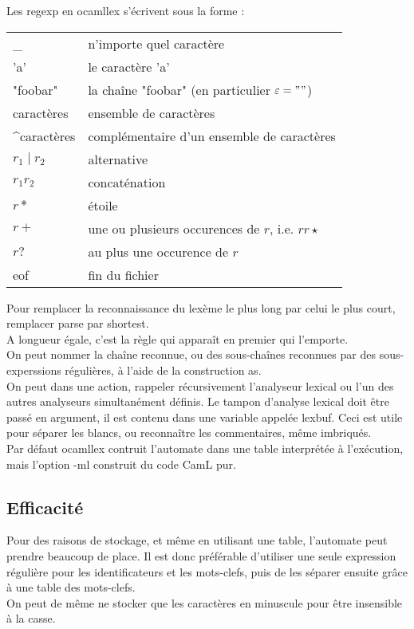 \documentclass{cours}
\begin{document}
Les regexp en \textmd{ocamllex} s'écrivent sous la forme : 
\begin{center}
    \begin{tabular}{>{\textmd{}}ll}
        \toprule
        \_  & n'importe quel caractère\\
        'a' & le caractère \textmd{'a'}\\
        "foobar" & la chaîne \textmd{"foobar"} (en particulier $\epsilon = ""$)\\
        \text{[}caractères\text{]} & ensemble de caractères\\
        \text{[}\^{}caractères\text{]} & complémentaire d'un ensemble de caractères\\
        $r_{1} \mid r_{2}$ & alternative \\
        $r_{1}r_{2}$ & concaténation \\
        $r *$ & étoile\\
        $r + $ & une ou plusieurs occurences de $r$, i.e. $r r\star$\\
        $r?$ & au plus une occurence de $r$\\
        eof & fin du fichier\\
        \bottomrule         
    \end{tabular}
\end{center}
Pour remplacer la reconnaissance du lexème le plus long par celui le plus court, remplacer \textmd{parse} par \textmd{shortest}.\\
A longueur égale, c'est la règle qui apparaît en premier qui l'emporte. \\
On peut nommer la chaîne reconnue, ou des sous-chaînes reconnues par des sous-experssions régulières, à l'aide de la construction \textmd{as}.\\
On peut dans une action, rappeler récursivement l'analyseur lexical ou l'un des autres analyseurs simultanément définis. Le tampon d'analyse lexical doit être passé en argument, il est contenu dans une variable appelée \textmd{lexbuf}. Ceci est utile pour séparer les blancs, ou reconnaître les commentaires, même imbriqués. \\

Par défaut \textmd{ocamllex} contruit l'automate dans une table interprétée à l'exécution, mais l'option \textmd{-ml} construit du code CamL pur. 

\subsection{Efficacité}
Pour des raisons de stockage, et même en utilisant une table, l'automate peut prendre beaucoup de place. Il est donc préférable d'utiliser une seule expression régulière pour les identificateurs et les mots-clefs, puis de les séparer ensuite grâce à une table des mots-clefs.\\
On peut de même ne stocker que les caractères en minuscule pour être insensible à la casse.
\end{document}
